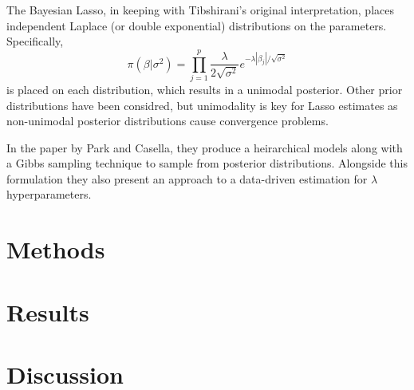 \documentclass{uwstat572}
\begin{document}
The Bayesian Lasso, in keeping with Tibshirani's original interpretation, places independent Laplace (or double exponential) distributions on the parameters. Specifically, \[
\pi(\beta|\sigma^2)=\prod_{j=1}^p\frac{\lambda}{2\sqrt{\sigma^2}}e^{-\lambda |\beta_j|/\sqrt{\sigma^2}}
\] is placed on each distribution, which results in a unimodal posterior. Other prior distributions have been considred, but unimodality is key for Lasso estimates as non-unimodal posterior distributions cause convergence problems.

In the paper by Park and Casella, they produce a heirarchical models along with a Gibbs sampling technique to sample from posterior distributions. Alongside this formulation they also present an approach to a data-driven estimation for $\lambda$ hyperparameters.\cite{park2008bayesian}

\section{Methods}

\section{Results}

\section{Discussion}


\end{document}
